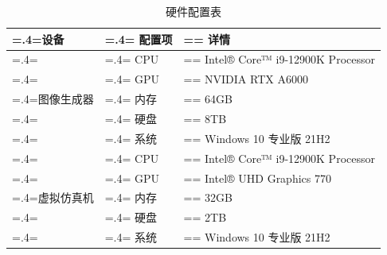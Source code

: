\begin{table}[h!]
    \begin{center}
        \caption{硬件配置表}
        \label{ffshard}
        \renewcommand\arraystretch{1.5}
        \begin{tabularx}{\textwidth}{ 
             >{\centering\arraybackslash\hsize=.4\hsize\linewidth=\hsize}X 
             >{\centering\arraybackslash\hsize=.4\hsize\linewidth=\hsize}X 
             >{\centering\arraybackslash\hsize=\hsize\linewidth=\hsize}X 
             }
             \hline
            \textbf{设备} & \textbf{配置项} & \textbf{详情}\\         
             \hline
             & CPU & Intel® Core™ i9-12900K Processor\\
           
             & GPU & NVIDIA RTX A6000\\
             
             图像生成器 & 内存 & 64GB\\
            
             & 硬盘 & 8TB\\
             
             & 系统 & Windows 10 专业版 21H2\\
             \hline
             & CPU & Intel® Core™ i9-12900K Processor\\
           
             & GPU & Intel® UHD Graphics 770\\
             
             虚拟仿真机 & 内存 & 32GB\\
            
             & 硬盘 & 2TB\\
             
             & 系统 & Windows 10 专业版 21H2\\
             \hline
             
            \end{tabularx}
    \end{center}
\end{table}
